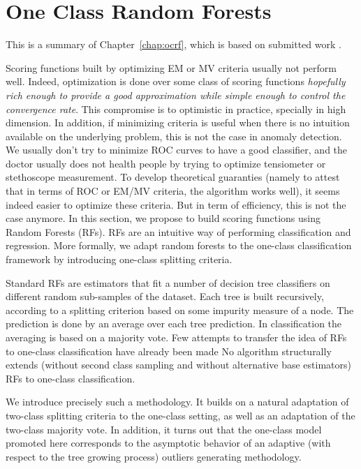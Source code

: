 \section{One Class Random Forests}
This is a summary of Chapter~\ref{chap:ocrf}, which is based on submitted work \citep{OCRF16}.

Scoring functions built by optimizing EM or MV criteria usually not perform well. Indeed, optimization is done over some class of scoring functions \emph{hopefully rich enough to provide a good approximation while simple enough to control the convergence rate}. This compromise is to optimistic in practice, specially in high dimension. In addition, if minimizing criteria is useful when there is no intuition available on the underlying problem, this is not the case in anomaly detection. We usually don't try to minimize ROC curves to have a good classifier, and the doctor usually does not health people by trying to optimize tensiometer or stethoscope measurement. To develop theoretical guaranties (namely to attest that in terms of ROC or EM/MV criteria, the algorithm works well), it seems indeed easier to optimize these criteria. But in term of efficiency, this is not the case anymore. %
In this section, we propose to build scoring functions using Random Forests (RFs). RFs \citep{Breiman2001} are an intuitive way of performing classification and regression. More formally, we adapt random forests to the one-class classification framework by introducing one-class splitting criteria.

Standard RFs are estimators that fit a number of decision tree
classifiers on different random sub-samples of the dataset.
Each tree is built recursively, according to a splitting criterion based on
some impurity measure of a node. The prediction is done by an average over each tree prediction. In classification the averaging is based on a majority vote.
Few attempts to transfer the idea of RFs to one-class
classification have already been made \citep{Desir12, Liu2008, Shi2012}
%
No algorithm structurally extends (without second class sampling and without alternative base estimators) RFs to one-class classification.

We introduce precisely such a methodology. It builds on a natural adaptation of two-class %
splitting criteria to the one-class setting, as well as an adaptation of the two-class majority vote.
In addition, it turns out that the one-class model promoted here corresponds to the asymptotic behavior of an adaptive (with respect to the tree growing process) outliers generating methodology.


